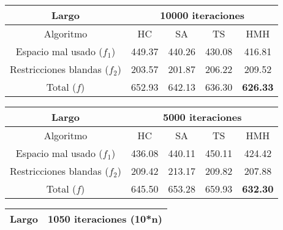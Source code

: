 \documentclass[letter, 10pt]{article}
\begin{document}
\renewcommand{\tablename}{Tabla}
\begin{table}[H]
    \begin{center}
    \begin{tabular}{|c|cccc|}
    \hline
    Largo                        & \multicolumn{4}{c|}{10000 iteraciones}                                                                    \\ \hline
    Algoritmo                    & \multicolumn{1}{c|}{HC}     & \multicolumn{1}{c|}{SA}     & \multicolumn{1}{c|}{TS}     & HMH             \\ \hline
    Espacio mal usado ($f_1$)     & \multicolumn{1}{c|}{449.37} & \multicolumn{1}{c|}{440.26} & \multicolumn{1}{c|}{430.08} & 416.81          \\ \hline
    Restricciones blandas ($f_2$) & \multicolumn{1}{c|}{203.57} & \multicolumn{1}{c|}{201.87} & \multicolumn{1}{c|}{206.22} & 209.52          \\ \hline
    Total ($f$)                    & \multicolumn{1}{c|}{652.93} & \multicolumn{1}{c|}{642.13} & \multicolumn{1}{c|}{636.30} & \textbf{626.33} \\ \hline
    \end{tabular}
    \begin{tabular}{|c|cccc|}
    \hline
    Largo                        & \multicolumn{4}{c|}{5000 iteraciones}                                                                    \\ \hline
    Algoritmo                    & \multicolumn{1}{c|}{HC}     & \multicolumn{1}{c|}{SA}     & \multicolumn{1}{c|}{TS}     & HMH             \\ \hline
    Espacio mal usado ($f_1$)     & \multicolumn{1}{c|}{436.08} & \multicolumn{1}{c|}{440.11} & \multicolumn{1}{c|}{450.11} & 424.42          \\ \hline
    Restricciones blandas ($f_2$) & \multicolumn{1}{c|}{209.42} & \multicolumn{1}{c|}{213.17} & \multicolumn{1}{c|}{209.82} & 207.88          \\ \hline
    Total ($f$)                    & \multicolumn{1}{c|}{645.50} & \multicolumn{1}{c|}{653.28} & \multicolumn{1}{c|}{659.93} & \textbf{632.30} \\ \hline
    \end{tabular}
    \begin{tabular}{|c|cccc|}
    \hline
    Largo                        & \multicolumn{4}{c|}{1050 iteraciones (10*n)}                                                                    \\ \hline

\end{tabular}
\end{center}
\end{table}
\end{document}
